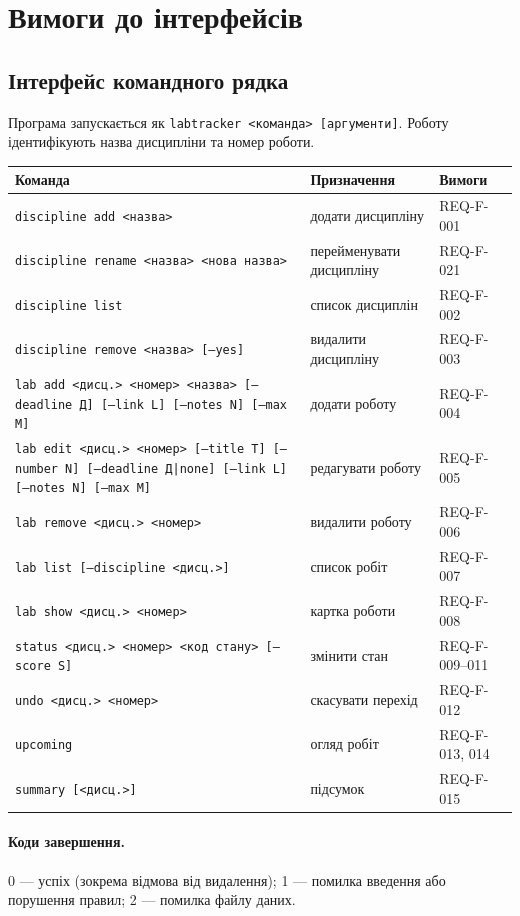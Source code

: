 \documentclass[12pt,a4paper]{article}
\newcommand{\code}[1]{\texttt{#1}}
\begin{document}
\section{Вимоги до інтерфейсів}

\subsection{Інтерфейс командного рядка}
Програма запускається як \code{labtracker <команда> [аргументи]}.
Роботу ідентифікують назва дисципліни та номер роботи.

\begin{longtable}{>{\raggedright}p{} >{\raggedright}p{} p{}}
\toprule
\textbf{Команда} & \textbf{Призначення} & \textbf{Вимоги} \\
\midrule
\endhead
\code{discipline add <назва>} & додати дисципліну & REQ-F-001 \\
\code{discipline rename <назва> <нова назва>} & перейменувати дисципліну & REQ-F-021 \\
\code{discipline list} & список дисциплін & REQ-F-002 \\
\code{discipline remove <назва> [--yes]} & видалити дисципліну & REQ-F-003 \\
\code{lab add <дисц.> <номер> <назва> [--deadline Д] [--link L] [--notes N] [--max M]} & додати роботу & REQ-F-004 \\
\code{lab edit <дисц.> <номер> [--title T] [--number N] [--deadline Д|none] [--link L] [--notes N] [--max M]} & редагувати роботу & REQ-F-005 \\
\code{lab remove <дисц.> <номер>} & видалити роботу & REQ-F-006 \\
\code{lab list [--discipline <дисц.>]} & список робіт & REQ-F-007 \\
\code{lab show <дисц.> <номер>} & картка роботи & REQ-F-008 \\
\code{status <дисц.> <номер> <код стану> [--score S]} & змінити стан & REQ-F-009--011 \\
\code{undo <дисц.> <номер>} & скасувати перехід & REQ-F-012 \\
\code{upcoming} & огляд робіт & REQ-F-013, 014 \\
\code{summary [<дисц.>]} & підсумок & REQ-F-015 \\
\bottomrule
\end{longtable}

\paragraph{Коди завершення.} 0 --- успіх (зокрема відмова від видалення); 1 --- помилка введення або порушення правил; 2 --- помилка файлу даних.
\end{document}
